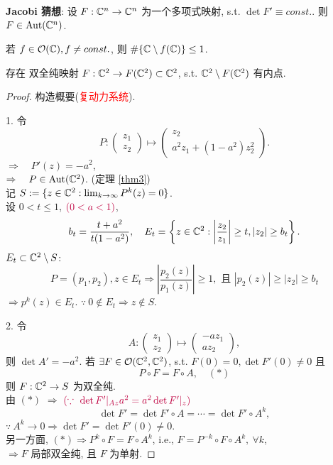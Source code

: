 \textbf{Jacobi 猜想}: 设 $F:{\mathbb C}^n \to {\mathbb C}^n $ 为一个多项式映射, s.t. $\det F' \equiv const.$. 则 $F \in \operatorname{Aut}({\mathbb C}^n)$.   

\begin{remark}
  若 $f \in \mathcal{O}({\mathbb C}), f \neq const.$,  
  则 $\#\{{\mathbb C} \setminus f({\mathbb C})\}\leq 1$. 
\end{remark}

\begin{theorem}
  存在 双全纯映射 $F:{\mathbb C}^2 \to F({\mathbb C}^2) \subset {\mathbb C}^2$, s.t. ${\mathbb C}^2 \setminus F({\mathbb C}^2)$ 有内点.  
\end{theorem}
\begin{proof}
  构造概要(\textcolor{red}{复动力系统}).

  1. 令 
  $$ P:\begin{pmatrix}
    z_1 \\
    z_2
  \end{pmatrix}
  \mapsto 
  \begin{pmatrix}
    z_2 \\
    a^2z_1+(1-a^2)z_2^2
  \end{pmatrix}.
   $$
   $\Rightarrow \quad P'(z)=-a^2$, \\
   $\Rightarrow  \quad P \in \operatorname{Aut}({\mathbb C}^2)$. (定理 \ref{thm3})\\
   记 $S:=\{z \in {\mathbb C}^2: \lim_{k \to \infty }P^k(z) =0\}$.\\
   设 $0 <t \leq 1$, $\textcolor{purple}{(0<a<1)}$, 
   $$b_t=\frac{t+a^2}{t(1-a^2)}, \quad E_t=\left\{z \in {\mathbb C}^2: \left|   \frac{z_2}{z_1}\right|\geq t,|z_2| \geq b_t\right\}.$$      
   $E_t \subset {\mathbb C}^2 \setminus  S$: 
   $$ P=(p_1,p_2),z \in E_t \Rightarrow \left| \frac{p_2(z)}{p_1(z)} \right| \geq 1, \text{ 且 } \left| p_2(z) \right| \geq |z_2| \geq b_t  $$ 
   $\Rightarrow p^k(z)\in E_t$. $\because~ 0 \not\in E_t \Rightarrow z \not\in S $. 

2. 令 
$$ A: \begin{pmatrix}
    z_1 \\
    z_2
  \end{pmatrix}
  \mapsto 
  \begin{pmatrix}
    -a z_1 \\
    az_2
  \end{pmatrix} ,$$   
则 $\det A'=-a^2$. 
若 $\exists F \in \mathcal{O}({\mathbb C}^2,{\mathbb C}^2)$, s.t. $F(0)=0, \det F'(0) \neq 0 $ 且 
$$ P \circ F = F \circ A, \quad (*)$$   
则 $F:{\mathbb C}^2 \to S$ 为双全纯. \\
由 $(*)$ $\Rightarrow $ $ \textcolor{purple}{(\because ~ \det F'|_{Az} a^2=a^2 \det F'|_z )}$
$$ \det F' =\det F'\circ A = \cdots =\det F'\circ A^k ,$$
$\because ~ A^k \to 0 \Rightarrow \det F'=\det F'(0) \neq 0.$   \\
另一方面, $(*)\Rightarrow P^k \circ F=F \circ A^k$, i.e., $F=P^{-k}\circ F \circ A^{k}, ~ \forall k$, \\
$\Rightarrow F$ 局部双全纯, 且 $F$ 为单射.    


\end{proof}
